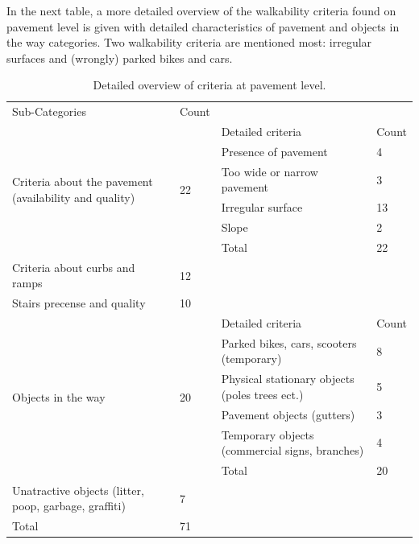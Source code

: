 In the next table, a more detailed overview of the walkability criteria found on pavement level is given with detailed characteristics of pavement and objects in the way categories. Two walkability criteria are mentioned most: irregular surfaces and (wrongly) parked bikes and cars. 
\clearpage

\begin{table}[h]
\centering
\caption{Detailed overview of criteria at pavement level. \label{literaturepavement}}
\begin{tabular}{|p{135pt}|p{45pt}||p{135pt}|p{45pt}|}
\cline{1-2}
Sub-Categories & Count \\
\cline{1-2} \cline{1-2} \cline{3-4}
\multirow{6}{135pt}{Criteria about the pavement (availability and quality)} & \multirow{6}{*}{ 22 } & Detailed criteria & Count \\ \cline{3-4}
& & Presence of pavement & 4 \\
& & Too wide or narrow pavement & 3\\
& & Irregular surface & 13 \\
& & Slope & 2 \\
\cline{3-4}
& & Total & 22 \\
\hline

Criteria about curbs and ramps & 12 \\
\cline{1-2}
Stairs precense and quality & 10 \\
\hline
\multirow{6}{*}{Objects in the way} & \multirow{6}{*}{ 20 } & Detailed criteria & Count \\ \cline{3-4}
& & Parked bikes, cars, scooters (temporary) & 8 \\
& & Physical stationary objects (poles trees ect.) & 5\\
& & Pavement objects (gutters) & 3 \\
& & Temporary objects (commercial signs, branches) & 4 \\
\cline{3-4}
& & Total & 20\\
\hline
Unatractive objects (litter, poop, garbage, graffiti) & 7 \\
\cline{1-2} \cline{1-2}
Total & 71 \\
\cline{1-2} 
\end{tabular}
\end{table}





